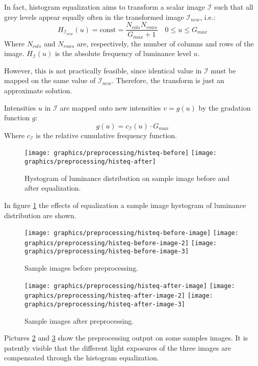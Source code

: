     \par{
        In fact, histogram equalization aims to transform a scalar image $\mathcal{I}$ such that all grey levels appear equally often in the transformed image $\mathcal{I}_{new}$, i.e.:
        \begin{equation*}
            H_{\mathcal{I}_{new}}(u) = \text{const} = \frac{N_{cols}N_{rows}}{G_{max} + 1} \quad 0 \leq u \leq G_{max}
        \end{equation*}
        Where $N_{cols}$ and $N_{rows}$ are, respectively, the number of columns and rows of the image. $H_{\mathcal{I}}(u)$ is the absolute frequency of luminance level $u$.
    }
    \par{
        However, this is not practically feasible, since identical value in $\mathcal{I}$ must be mapped on the same value of $\mathcal{I}_{new}$. Therefore, the transform is just an approximate solution.
    }
    \par{
        Intensities $u$ in $\mathcal{I}$ are mapped onto new intensities $v = g(u)$ by the gradation function $g$: 
        \begin{equation*}
            g(u) = c_{\mathcal{I}}(u) \cdot G_{max}
        \end{equation*}
        Where $c_{\mathcal{I}}$ is the relative cumulative frequency function.
    }
    \begin{figure}
        \texttt{[image: graphics/preprocessing/histeq-before]}
        \texttt{[image: graphics/preprocessing/histeq-after]}
        \caption{Hystogram of luminance distribution on sample image before and after equalization.}\label{fig:equalization}
    \end{figure}
    \par{
        In figure \ref{fig:equalization} the effects of equalization a sample image hystogram of luminance distribution are shown.
    }
    \begin{figure}
        \texttt{[image: graphics/preprocessing/histeq-before-image]}
        \texttt{[image: graphics/preprocessing/histeq-before-image-2]}
        \texttt{[image: graphics/preprocessing/histeq-before-image-3]}
        \caption{Sample images before preprocessing.}\label{fig:preprocessing_image_before}
    \end{figure}
    \begin{figure}
        \texttt{[image: graphics/preprocessing/histeq-after-image]}
        \texttt{[image: graphics/preprocessing/histeq-after-image-2]}
        \texttt{[image: graphics/preprocessing/histeq-after-image-3]}
        \caption{Sample images after preprocessing.}\label{fig:preprocessing_image_after}
    \end{figure}
    \par{
        Pictures \ref{fig:preprocessing_image_before} and \ref{fig:preprocessing_image_after} show the preprocessing output on some samples images. It is patently visible that the different light exposures of the three images are compensated through the histogram equalization.
    }
